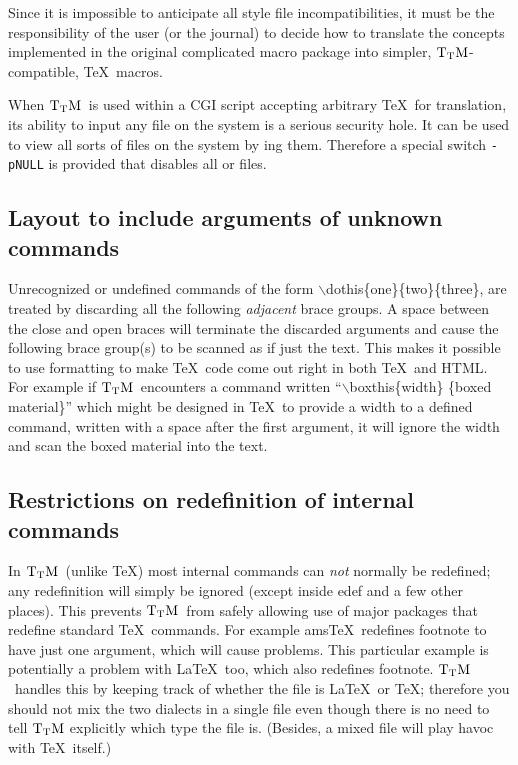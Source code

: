 \documentclass[12pt]{article}
\def\TtM{$\rm{}T_TH$}
\def\TtM{$\rm{}T_TM$}%
\begin{document}
Since it is impossible to anticipate all style file incompatibilities,
it must be the responsibility of the user (or the journal) to decide
how to translate the concepts implemented in the original complicated
macro package into simpler, \TtM-compatible, \TeX\ macros.

When \TtM\ is used within a CGI script accepting arbitrary \TeX\ for
translation, its ability to input any file on the system is a serious
security hole. It can be used to view all sorts of files on the system
by \verb!!ing them. Therefore a special switch \verb!-pNULL! is
provided that disables all \verb!! or \verb!! files.

\subsection{Layout to include arguments of unknown
commands
}

Unrecognized or undefined commands of the form
$\backslash$dothis\{one\}\{two\}\{three\}, are treated by discarding
all the following {\it adjacent} brace groups. A space between the close and
open braces will terminate the discarded arguments and cause the
following brace group(s) to be scanned as if just the text. This
makes it possible to use formatting to make \TeX\ code come out right in
both \TeX\ and HTML. For example if \TtM\ encounters a command written
``$\backslash$boxthis\{width\} \{boxed material\}'' which might be
designed in \TeX\ to provide a width to a defined command, written with
a space after the first argument, it will ignore the width and scan
the boxed material into the text.

\subsection{Restrictions on redefinition of internal
commands
}

In \TtM\ (unlike \TeX) most internal commands can {\it not} normally be
redefined; any redefinition will simply be ignored (except inside edef
and a few other places). This prevents \TtM\ from safely allowing use of
major packages that redefine standard \TeX\ commands. For example ams\TeX\
redefines footnote to have just one argument, which will cause
problems. This particular example is potentially a problem with \LaTeX\
too, which also redefines footnote. \TtM\ handles this by keeping track
of whether the file is \LaTeX\ or \TeX; therefore you should not mix the
two dialects in a single file even though there is no need to tell \TtM
explicitly which type the file is. (Besides, a mixed file will play
havoc with \TeX\ itself.)
 
\end{document}
